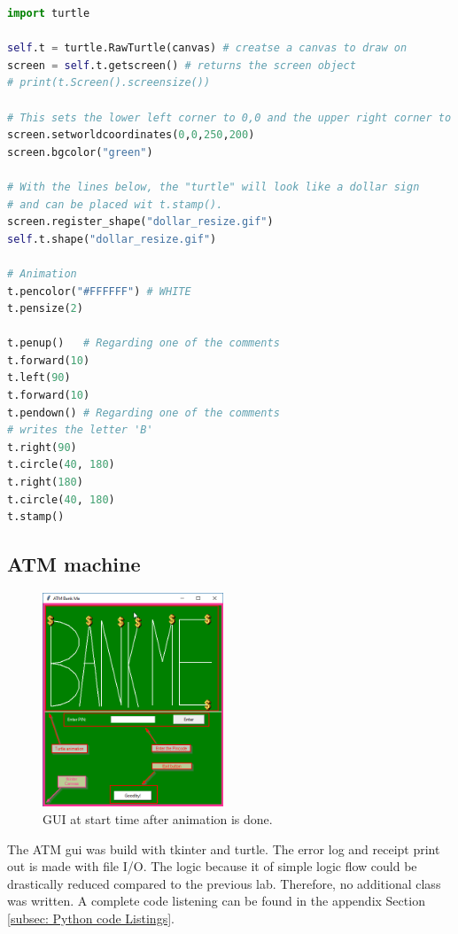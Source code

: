 \begin{lstlisting}[style=PythonStyle, language=Python, caption={Python turtle example code for a letter 'B'.},label=lst: Python turtle example code]
import turtle

self.t = turtle.RawTurtle(canvas) # creatse a canvas to draw on
screen = self.t.getscreen() # returns the screen object 
# print(t.Screen().screensize()) 

# This sets the lower left corner to 0,0 and the upper right corner to 600,600. 
screen.setworldcoordinates(0,0,250,200)
screen.bgcolor("green")

# With the lines below, the "turtle" will look like a dollar sign 
# and can be placed wit t.stamp().
screen.register_shape("dollar_resize.gif")
self.t.shape("dollar_resize.gif")

# Animation
t.pencolor("#FFFFFF") # WHITE
t.pensize(2)

t.penup()   # Regarding one of the comments
t.forward(10)
t.left(90)
t.forward(10)
t.pendown() # Regarding one of the comments
# writes the letter 'B'
t.right(90)
t.circle(40, 180)
t.right(180)
t.circle(40, 180)
t.stamp()
\end{lstlisting}

\subsection{ATM machine}\label{subsec: ATM machine }
\begin{figure}
	\centering
	\vspace{-1cm}\includegraphics[width=0.48\textwidth]{01_images/gui_pin.PNG}
	\caption{GUI at start time after animation is done.}
	\label{fig: gui_pin}
\end{figure}
The ATM gui was build with tkinter and turtle. The error log and receipt print out is made with file I/O. The logic because it of simple logic flow could be drastically reduced compared to the previous lab. Therefore, no additional class was written. A complete code listening can be found in the appendix Section \ref{subsec: Python code Listings}. 

